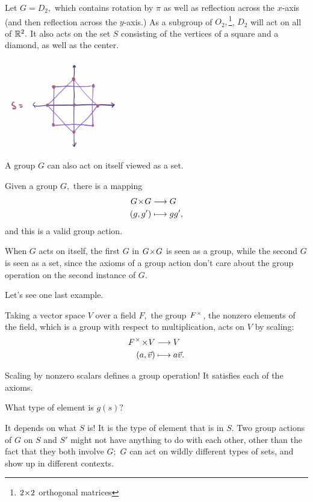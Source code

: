 \begin{example}[$D_2$]\label{grp action d2}
Let $G = D_2,$ which contains rotation by $\pi$ as well as reflection across the $x$-axis (and then reflection across the $y$-axis.) As a subgroup of $O_2,$\footnote{$2 \hspace{0.05em}{\times}\hspace{0.05em} 2$ orthogonal matrices}, $D_2$ will act on all of $\mathbb R^2.$ It also acts on the set $S$ consisting of the vertices of a square and a diamond, as well as the center. 

\begin{center}
    \includegraphics[width=5cm]{Lecture Files and Images/lec17-S.png}
\end{center}
\end{example}

A group $G$ can also act on itself viewed as a set.
\begin{example}
Given a group $G,$ there is a mapping
\begin{align*}
    G \hspace{0.05em}{\times}\hspace{0.05em} G &\longrightarrow G \\
    (g, g') &\longmapsto gg',
\end{align*}
and this is a valid group action. 
\end{example}

When $G$ acts on itself, the first $G$ in $G \hspace{0.05em}{\times}\hspace{0.05em} G$ is seen as a group, while the second $G$ is seen as a set, since the axioms of a group action don't care about the group operation on the second instance of $G$.

Let's see one last example. 
\begin{example}
Taking a vector space $V$ over a field $F,$ the group $F^{\hspace{0.05em}{\times}\hspace{0.05em}}$, the nonzero elements of the field, which is a group with respect to multiplication, acts on $V$ by scaling:
\begin{align*}
    F^{\hspace{0.05em}{\times}\hspace{0.05em}} \hspace{0.05em}{\times}\hspace{0.05em} V &\longrightarrow V \\
    (a, \vec{v}) &\longmapsto a\vec{v}.
\end{align*}
\end{example}

Scaling by nonzero scalars defines a group operation! It satisfies each of the axioms. 

\begin{question}
What type of element is $g(s)?$
\end{question}
\begin{ans}
It depends on what $S$ is! It is the type of element that is in $S.$ Two group actions of $G$ on $S$ and $S'$ might not have anything to do with each other, other than the fact that they both involve $G;$ $G$ can act on wildly different types of sets, and show up in different contexts.
\end{ans}


